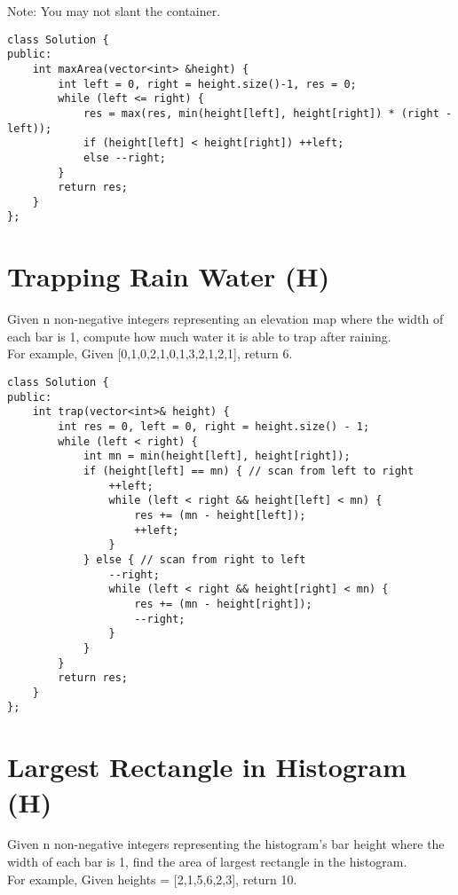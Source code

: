 Note: You may not slant the container. \\

\begin{lstlisting}
class Solution {
public:
    int maxArea(vector<int> &height) {
        int left = 0, right = height.size()-1, res = 0;
        while (left <= right) {
            res = max(res, min(height[left], height[right]) * (right - left));
            if (height[left] < height[right]) ++left;
            else --right;
        }
        return res;
    }
};
\end{lstlisting}


\section {Trapping Rain Water (H)}
Given n non-negative integers representing an elevation map where the width of each bar is 1, compute how much water it is able to trap after raining.\\

For example, Given [0,1,0,2,1,0,1,3,2,1,2,1], return 6. \\

\begin{lstlisting}
class Solution {
public:
    int trap(vector<int>& height) {
        int res = 0, left = 0, right = height.size() - 1;
        while (left < right) {
            int mn = min(height[left], height[right]);
            if (height[left] == mn) { // scan from left to right
                ++left;
                while (left < right && height[left] < mn) {
                    res += (mn - height[left]);
                    ++left;
                }
            } else { // scan from right to left
                --right;
                while (left < right && height[right] < mn) {
                    res += (mn - height[right]);
                    --right;
                }
            }
        }
        return res;
    }
};
\end{lstlisting}


\section{Largest Rectangle in Histogram (H)}
Given n non-negative integers representing the histogram's bar height where the width of each bar is 1, find the area of largest rectangle in the histogram. \\

For example,
Given heights = [2,1,5,6,2,3],
return 10. \\

